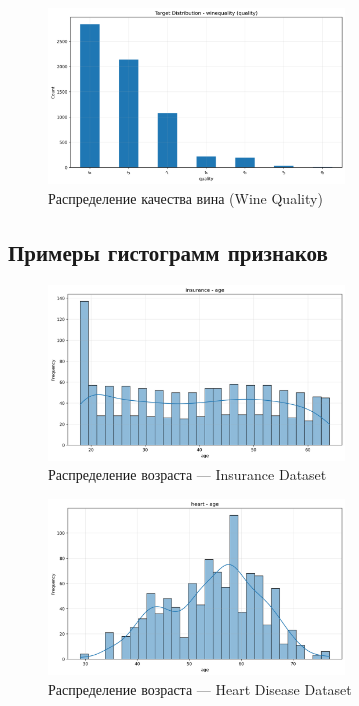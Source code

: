 \documentclass[a4paper]{article}
\begin{document}
\begin{figure}[H]
\centering
\includegraphics[width=0.7\textwidth]{images/target_distribution_winequality.png}
\caption{Распределение качества вина (Wine Quality)}
\end{figure}

\subsection{Примеры гистограмм признаков}

\begin{figure}[H]
\centering
\includegraphics[width=0.7\textwidth]{images/hist_insurance_age.png}
\caption{Распределение возраста — Insurance Dataset}
\end{figure}

\begin{figure}[H]
\centering
\includegraphics[width=0.7\textwidth]{images/hist_heart_age.png}
\caption{Распределение возраста — Heart Disease Dataset}
\end{figure}
\end{document}
